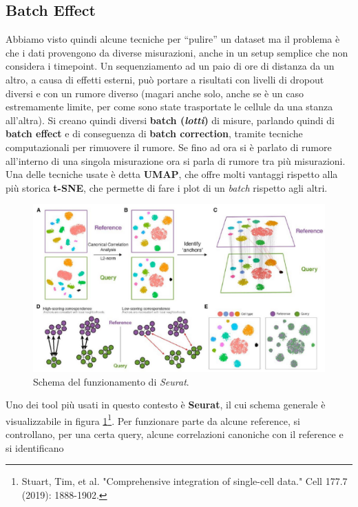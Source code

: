 \documentclass[a4paper,12pt, oneside]{book}
\begin{document}
\subsection{Batch Effect}
Abbiamo visto quindi alcune tecniche per ``pulire'' un dataset ma il problema è
che i dati provengono da diverse misurazioni, anche in un setup
semplice che non considera i timepoint. Un sequenziamento ad un paio di ore di
distanza da un altro, a causa di effetti esterni, può portare a risultati con
livelli di dropout diversi e con un rumore diverso (magari anche solo, anche se
è un caso estremamente limite, per come
sono state trasportate le cellule da una stanza all'altra). Si creano quindi
diversi \textbf{batch (\textit{lotti})} di misure, parlando quindi di
\textbf{batch effect} e di conseguenza di \textbf{batch correction}, tramite
tecniche computazionali per rimuovere il rumore. Se fino ad ora si è parlato di
rumore all'interno di una singola misurazione ora si parla di rumore tra più
misurazioni. \\ 
Una delle tecniche usate è detta \textbf{UMAP}, che offre molti vantaggi
rispetto alla più storica \textbf{t-SNE}, che permette di fare i plot di un
\textit{batch} rispetto agli altri.\\
\begin{figure}
  \centering
  \includegraphics[scale = 0.235]{img/seu.jpg}
  \caption{Schema del funzionamento di \textit{Seurat}.}
  \label{fig:seu}
\end{figure}
Uno dei tool più usati in questo contesto è \textbf{Seurat}, il cui schema
generale è visualizzabile in figura \ref{fig:seu}\footnote{Stuart, Tim, et
  al. "Comprehensive integration of single-cell data." Cell 177.7 (2019):
  1888-1902.}. Per funzionare parte da alcune reference, si controllano, per una
certa query, alcune correlazioni canoniche con il reference e si identificano
\end{document}
